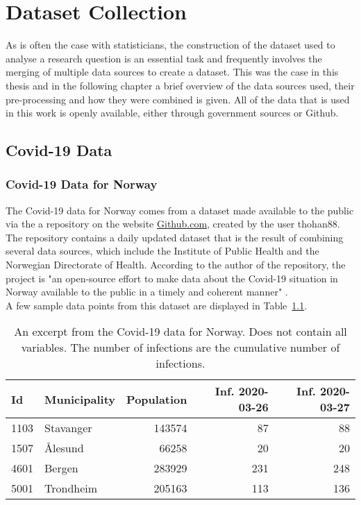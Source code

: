 %
\chapter{Dataset Collection}
As is often the case with statisticians, the construction of the dataset used to analyse a research question is an essential task and frequently involves the merging of multiple data sources to create a dataset. This was the case in this thesis and in the following chapter a brief overview of the data sources used, their pre-processing and how they were combined is given. All of the data that is used in this work is openly available, either through government sources or Github.
\label{sec:datacollection}
\clearpage
\section{Covid-19 Data}
\subsection{Covid-19 Data for Norway}
The Covid-19 data for Norway comes from a dataset made available to the public via the a repository on the website \href{https://www.github.com}{Github.com}, created by the user thohan88. The repository contains a daily updated dataset that is the result of combining several data sources, which include the Institute of Public Health and the Norwegian Directorate of Health. According to the author of the repository, the project is "an open-source effort to make data about the Covid-19 situation in Norway available to the public in a timely and coherent manner" \autocite[][]{thohan88}. \\
A few sample data points from this dataset are displayed in Table~\ref{datasetNorge}.\\
\begin{table}[H] 
\caption{An excerpt from the Covid-19 data for Norway. Does not contain all variables. The number of infections are the cumulative number of infections. \label{datasetNorge}}
\begin{tabular}{l l r r r}
\toprule
\textbf{Id}	& \textbf{Municipality}	& \textbf{Population}	& \textbf{Inf. 2020-03-26}	& \textbf{Inf. 2020-03-27}\\
\midrule
1103 & Stavanger & 143574 & 87 & 88 \\
1507 & Ålesund & 66258 & 20 & 20 \\
4601 & Bergen & 283929 & 231 & 248 \\
5001 & Trondheim & 205163 & 113 & 136 \\
\bottomrule
\end{tabular}
\end{table}
